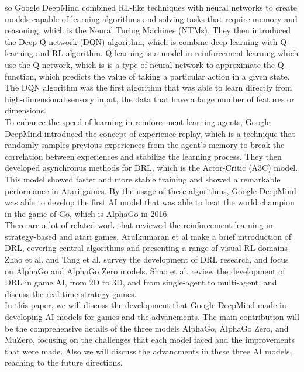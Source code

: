so Google DeepMind combined RL-like techniques with neural networks to create models capable of 
learning algorithms and solving tasks that require memory and reasoning, which is the Neural Turing 
Machines (NTMs)\cite{I4}.
They then introduced the Deep Q-network (DQN) algorithm, which is combine deep learning 
with Q-learning and RL algorithm. Q-learning is a model in reinforcement learning which use 
the Q-network, which is is a type of neural network to approximate the Q-function, which predicts 
the value of taking a particular action in a given state\cite{I5}. The DQN algorithm was the first 
algorithm that was able to learn directly from high-dimensional sensory input, the data that have a 
large number of features or dimensions\cite{I6}.\\
To enhance the speed of learning in reinforcement learning agents, Google DeepMind introduced the 
concept of experience replay, which is a technique that randomly samples previous experiences from 
the agent's memory to break the correlation between experiences and stabilize the learning process\cite{I7}. 
They then developed asynchronus methods for DRL, which is the Actor-Critic (A3C) model. This model showed 
faster and more stable training and showed a remarkable performance in Atari games\cite{I8}. By the usage of 
these algorithms, Google DeepMind was able to develop the first AI model that was able to beat the world 
champion in the game of Go, which is AlphaGo in 2016.\\ 
There are a lot of related work that reviewed the reinforcement learning in strategy-based and atari games. 
Arulkumaran et al\cite{I9} make a brief introduction of DRL, covering central algorithms and presenting a 
range of visual RL domains Zhao et al.\cite{I10} and Tang et al.\cite{I11} survey the development of DRL 
research, and focus on AlphaGo and AlphaGo Zero models. Shao et al.\cite{I12} review the development of 
DRL in game AI, from 2D to 3D, and from single-agent to multi-agent, and discuss the real-time strategy games.\\
In this paper, we will discuss the development that Google DeepMind made in developing AI models for games and 
the advancments. The main contribution will be the comprehensive details of the three models AlphaGo, AlphaGo Zero, 
and MuZero, focusing on the challenges that each model faced and the improvements that were made. Also we will 
discuss the advancments in these three AI models, reaching to the future directions.
